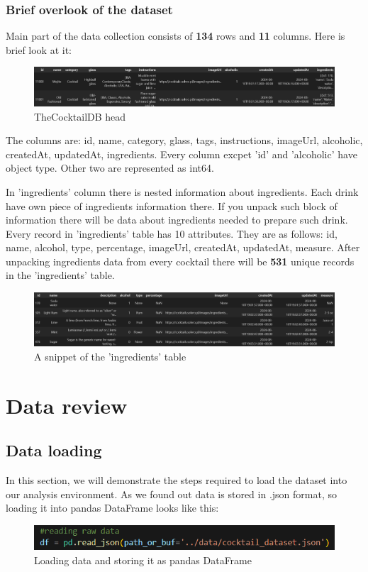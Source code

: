 \documentclass[a4paper]{article}
\begin{document}
\subsubsection{Brief overlook of the dataset}
Main part of the data collection consists of \textbf{134} rows and \textbf{11} columns. Here is brief look at it:

\begin{figure}[H]
    \centering
    \includegraphics[width=1\linewidth]{base_head.png}
    \caption{TheCocktailDB head}
    \label{fig:TheCocktailDB_head}
\end{figure}

The columns are: id, name, category, glass, tags, instructions, imageUrl, alcoholic, createdAt, updatedAt, ingredients. Every column excpet 'id' and 'alcoholic' have object type. Other two are represented as int64.

In 'ingredients' column there is nested information about ingredients. Each drink have own piece of ingredients information there. If you unpack such block of information there will be data about ingredients needed to prepare such drink. Every record in 'ingredients' table has 10 attributes. They are as follows: id, name, alcohol, type, percentage, imageUrl, createdAt, updatedAt, measure. After unpacking ingredients data from every cocktail there will be \textbf{531} unique records in the 'ingredients' table.

\begin{figure}[H]
    \centering
    \includegraphics[width=1\linewidth]{ingredients_head.png}
    \caption{A snippet of the 'ingredients' table}
    \label{fig:ingredients_head}
\end{figure}

\section{Data review}
\subsection{Data loading}
In this section, we will demonstrate the steps required to load the dataset into our analysis environment. As we found out data is stored in .json format, so loading it into pandas DataFrame looks like this:
\begin{figure}[H]
    \centering
    \includegraphics[width=1\linewidth]{loading.png}
    \caption{Loading data and storing it as pandas DataFrame}
    \label{fig:enter-label}
\end{figure}
\end{document}
